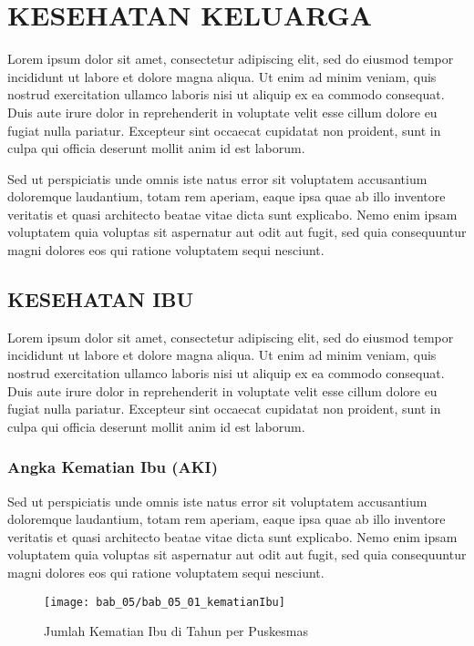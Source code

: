 \chapter{KESEHATAN KELUARGA}
Lorem ipsum dolor sit amet, consectetur adipiscing elit, sed do eiusmod tempor incididunt ut labore et dolore magna aliqua. Ut enim ad minim veniam, quis nostrud exercitation ullamco laboris nisi ut aliquip ex ea commodo consequat. Duis aute irure dolor in reprehenderit in voluptate velit esse cillum dolore eu fugiat nulla pariatur. Excepteur sint occaecat cupidatat non proident, sunt in culpa qui officia deserunt mollit anim id est laborum.

Sed ut perspiciatis unde omnis iste natus error sit voluptatem accusantium doloremque laudantium, totam rem aperiam, eaque ipsa quae ab illo inventore veritatis et quasi architecto beatae vitae dicta sunt explicabo. Nemo enim ipsam voluptatem quia voluptas sit aspernatur aut odit aut fugit, sed quia consequuntur magni dolores eos qui ratione voluptatem sequi nesciunt.

\section{KESEHATAN IBU}
Lorem ipsum dolor sit amet, consectetur adipiscing elit, sed do eiusmod tempor incididunt ut labore et dolore magna aliqua. Ut enim ad minim veniam, quis nostrud exercitation ullamco laboris nisi ut aliquip ex ea commodo consequat. Duis aute irure dolor in reprehenderit in voluptate velit esse cillum dolore eu fugiat nulla pariatur. Excepteur sint occaecat cupidatat non proident, sunt in culpa qui officia deserunt mollit anim id est laborum.

\subsection{Angka Kematian Ibu (AKI)}
Sed ut perspiciatis unde omnis iste natus error sit voluptatem accusantium doloremque laudantium, totam rem aperiam, eaque ipsa quae ab illo inventore veritatis et quasi architecto beatae vitae dicta sunt explicabo. Nemo enim ipsam voluptatem quia voluptas sit aspernatur aut odit aut fugit, sed quia consequuntur magni dolores eos qui ratione voluptatem sequi nesciunt.

\begin{figure}[H]
    \centering{}
    \texttt{[image: bab\_05/bab\_05\_01\_kematianIbu]}
    \caption{Jumlah Kematian Ibu di \namaKabupaten Tahun \tP per Puskesmas}
    \label{fig:Jumlah-Kematian-Ibu}
\end{figure}

